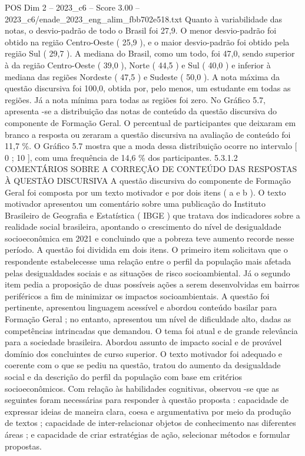 \begin{textsample}{POS Dim 2 – 2023\_c6 – Score 3.00 – 2023\_c6/enade\_2023\_eng\_alim\_fbb702e518.txt}
Quanto à variabilidade das notas, o desvio-padrão de todo o Brasil foi 27,9.
O menor desvio-padrão foi obtido na região Centro-Oeste ( 25,9 ), e o maior desvio-padrão foi obtido pela região Sul ( 29,7 ).
A mediana do Brasil, como um todo, foi 47,0, sendo superior à da região Centro-Oeste ( 39,0 ), Norte ( 44,5 ) e Sul ( 40,0 ) e inferior à mediana das regiões Nordeste ( 47,5 ) e Sudeste ( 50,0 ).
A nota máxima da questão discursiva foi 100,0, obtida por, pelo menos, um estudante em todas as regiões.
Já a nota mínima para todas as regiões foi zero.
No Gráfico 5.7, apresenta -se a distribuição das notas de conteúdo da questão discursiva do componente de Formação Geral.
O percentual de participantes que deixaram em branco a resposta ou zeraram a questão discursiva na avaliação de conteúdo foi 11,7 \%.
O Gráfico 5.7 mostra que a moda dessa distribuição ocorre no intervalo [ 0 ; 10 ], com uma frequência de 14,6 \% dos participantes. 5.3.1.2 COMENTÁRIOS SOBRE A CORREÇÃO DE CONTEÚDO DAS RESPOSTAS À QUESTÃO DISCURSIVA A questão discursiva do componente de Formação Geral foi composta por um texto motivador e por dois itens ( a e b ).
O texto motivador apresentou um comentário sobre uma publicação do Instituto Brasileiro de Geografia e Estatística ( IBGE ) que tratava dos indicadores sobre a realidade social brasileira, apontando o crescimento do nível de desigualdade socioeconômica em 2021 e concluindo que a pobreza teve aumento recorde nesse período.
A questão foi dividida em dois itens.
O primeiro item solicitava que o respondente estabelecesse uma relação entre o perfil da população mais afetada pelas desigualdades sociais e as situações de risco socioambiental.
Já o segundo item pedia a proposição de duas possíveis ações a serem desenvolvidas em bairros periféricos a fim de minimizar os impactos socioambientais.
A questão foi pertinente, apresentou linguagem acessível e abordou conteúdo basilar para Formação Geral ; no entanto, apresentou um nível de dificuldade alto, dadas as competências intrincadas que demandou.
O tema foi atual e de grande relevância para a sociedade brasileira.
Abordou assunto de impacto social e de provável domínio dos concluintes de curso superior.
O texto motivador foi adequado e coerente com o que se pediu na questão, tratou do aumento da desigualdade social e da descrição do perfil da população com base em critérios socioeconômicos.
Com relação às habilidades cognitivas, observou -se que as seguintes foram necessárias para responder à questão proposta : capacidade de expressar ideias de maneira clara, coesa e argumentativa por meio da produção de textos ; capacidade de inter-relacionar objetos de conhecimento nas diferentes áreas ; e capacidade de criar estratégias de ação, selecionar métodos e formular propostas.

\end{textsample}
